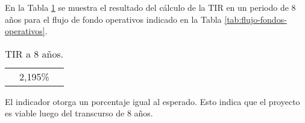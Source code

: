 En la Tabla \ref{tab:tir-8} se muestra el resultado del cálculo de la TIR en un periodo de 8 años para el flujo de fondo operativos indicado en la Tabla \ref{tab:flujo-fondos-operativos}.

\begin{table}[H]
  \centering
    \begin{tabular}{|cc|r|}
    \rowcolor[rgb]{ .773,  .851,  .945} \multicolumn{3}{c}{\textbf{a 8 años}} \bigstrut[b]\\
    \hline
    \rowcolor[rgb]{ .773,  .851,  .945} \multicolumn{2}{|c|}{\textbf{TIR}} & \cellcolor[rgb]{ 1,  1,  1}2,195\% \bigstrut\\
    \hline
    \end{tabular}%
  \caption{TIR a 8 años.}    
  \label{tab:tir-8}%
\end{table}%


El indicador otorga un porcentaje igual al esperado. Esto indica que el proyecto es viable luego del transcurso de 8 años.